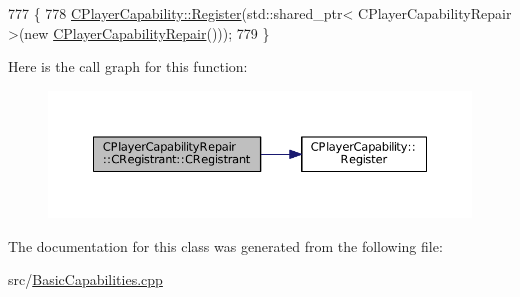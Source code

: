 \begin{DoxyCode}
777                                                \{
778     \hyperlink{classCPlayerCapability_a7e298018dcde2684451add3cfff065f7}{CPlayerCapability::Register}(std::shared\_ptr< CPlayerCapabilityRepair >(\textcolor{keyword}{new} 
      \hyperlink{classCPlayerCapabilityRepair_a1c11519a127c65cd5b5ead8d9537c240}{CPlayerCapabilityRepair}()));   
779 \}
\end{DoxyCode}
Here is the call graph for this function\+:\nopagebreak
\begin{figure}[H]
\begin{center}
\leavevmode
\includegraphics[width=350pt]{classCPlayerCapabilityRepair_1_1CRegistrant_aeffe332a2dd871a9c29f6d1fa780f473_cgraph}
\end{center}
\end{figure}


The documentation for this class was generated from the following file\+:\begin{DoxyCompactItemize}
\item 
src/\hyperlink{BasicCapabilities_8cpp}{Basic\+Capabilities.\+cpp}\end{DoxyCompactItemize}
